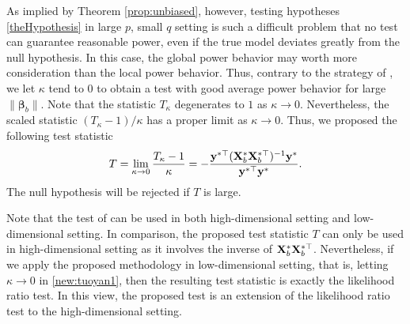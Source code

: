 \documentclass[smallextended]{svjour3}       %
\newcommand{\By}{\mathbf{y}}    \newcommand{\Bz}{\mathbf{z}}
\newcommand{\bfsym}[1]{\ensuremath{\boldsymbol{#1}}}
\def\bbeta{\bfsym \beta}
\begin{document}
As implied by Theorem \ref{prop:unbiased}, however, testing hypotheses \eqref{theHypothesis} in large $p$, small $q$ setting is such a difficult problem that no test can guarantee reasonable power, even if the true model deviates greatly from the null hypothesis.
In this case, the global power behavior may worth more consideration than the local power behavior.
Thus, contrary to the strategy of \cite{Goeman2006}, we let $\kappa$ tend to $0$ to obtain a test with good average power behavior for large $\|\bbeta_b\|$.
Note that the statistic $ T_{\kappa}$ degenerates to $1$ as $\kappa\to 0$.
Nevertheless, the scaled statistic $(T_{\kappa}-1)/\kappa$ has a proper limit as $\kappa\to 0$.
Thus, we proposed the following test statistic
\begin{equation*}
    T
    =
    \lim_{\kappa\to 0} \frac{T_{\kappa}-1}{\kappa}
    =
    -
     \frac{\By^{*\top} ( \BX_b^* \BX_b^{*\top} )^{-1} \By^* }{\By^{*\top} \By^*} .
\end{equation*}
The null hypothesis will be rejected if $T$ is large.

Note that the test of \cite{Goeman2006} can be used in both high-dimensional setting and low-dimensional setting.
In comparison, the proposed test statistic $T$ can only be used in high-dimensional setting as it involves the inverse of $ \mathbf{X}_b^* \mathbf{X}_b^{*\top}$. 
Nevertheless, if we apply the proposed methodology in low-dimensional setting, that is, letting $\kappa \to 0$ in \eqref{new:tuoyan1}, then the resulting test statistic is exactly the likelihood ratio test.
In this view, the proposed test is an extension of the likelihood ratio test to the high-dimensional setting.
\end{document}
